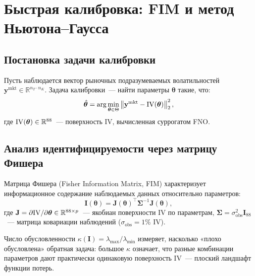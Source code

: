 
\section{Быстрая калибровка: FIM и метод Ньютона--Гаусса}
\label{sec:calibration}

\subsection{Постановка задачи калибровки}

Пусть наблюдается вектор рыночных подразумеваемых волатильностей
$\mathbf{y}^{\mathrm{mkt}} \in \mathbb{R}^{n_T \cdot n_K}$.
Задача калибровки~--- найти параметры $\boldsymbol\theta$ такие, что:
\begin{equation}
  \label{eq:calib_problem}
  \hat{\boldsymbol\theta} = \arg\min_{\boldsymbol\theta \in \Theta}
  \left\|\mathbf{y}^{\mathrm{mkt}} - \mathrm{IV}(\boldsymbol\theta)\right\|_2^2,
\end{equation}
где $\mathrm{IV}(\boldsymbol\theta) \in \mathbb{R}^{88}$~--- поверхность IV,
вычисленная суррогатом FNO.

\subsection{Анализ идентифицируемости через матрицу Фишера}
\label{sec:fim}

Матрица Фишера (Fisher Information Matrix, FIM) характеризует
информационное содержание наблюдаемых данных относительно параметров:
\begin{equation}
  \label{eq:fim}
  \mathbf{I}(\boldsymbol\theta) = \mathbf{J}(\boldsymbol\theta)^\top
  \boldsymbol\Sigma^{-1}
  \mathbf{J}(\boldsymbol\theta),
\end{equation}
где $\mathbf{J} = \partial\mathrm{IV}/\partial\boldsymbol\theta \in \mathbb{R}^{88\times p}$~---
якобиан поверхности IV по параметрам, $\boldsymbol\Sigma = \sigma^2_{\text{obs}}\mathbf{I}_{88}$~---
матрица ковариации наблюдений ($\sigma_{\text{obs}} = 1\%$ IV).

Число обусловленности $\kappa(\mathbf{I}) = \lambda_{\max}/\lambda_{\min}$
измеряет, насколько «плохо обусловлена» обратная задача:
большое $\kappa$ означает, что разные комбинации параметров дают
практически одинаковую поверхность IV~--- плоский ландшафт функции потерь.

